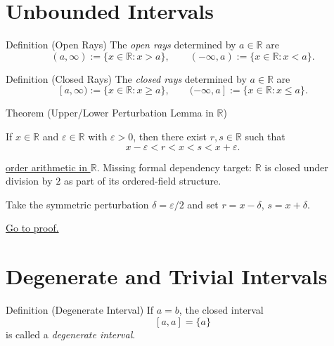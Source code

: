 \section*{Unbounded Intervals}

\begin{definitionbox}{Definition (Open Rays)}
The \emph{open rays} determined by $a \in \mathbb{R}$ are
\[
(a,\infty) := \{ x \in \mathbb{R} : x > a \},
\qquad
(-\infty,a) := \{ x \in \mathbb{R} : x < a \}.
\]
\end{definitionbox}

\begin{definitionbox}{Definition (Closed Rays)}
The \emph{closed rays} determined by $a \in \mathbb{R}$ are
\[
[a,\infty) := \{ x \in \mathbb{R} : x \ge a \},
\qquad
(-\infty,a] := \{ x \in \mathbb{R} : x \le a \}.
\]
\end{definitionbox}

\begin{theorembox}{Theorem (Upper/Lower Perturbation Lemma in $\mathbb{R}$)}
\begin{theorem}
\label{thm:real-upper-lower-perturbation}
If $x\in\mathbb{R}$ and $\varepsilon\in\mathbb{R}$ with $\varepsilon>0$, then
there exist $r,s\in\mathbb{R}$ such that
\[
x-\varepsilon<r<x<s<x+\varepsilon.
\]
\end{theorem}
\end{theorembox}

\begin{dependencies}
\hyperref[prop:order-arithmetic]{order arithmetic in $\mathbb{R}$}.
Missing formal dependency target: $\mathbb{R}$ is closed under division by $2$
as part of its ordered-field structure.
\end{dependencies}

\begin{remark*}
Take the symmetric perturbation $\delta=\varepsilon/2$ and set
$r=x-\delta$, $s=x+\delta$.
\end{remark*}

\begin{remark*}[Proof]
\hyperref[prf:real-upper-lower-perturbation]{Go to proof.}
\end{remark*}

\section*{Degenerate and Trivial Intervals}

\begin{definitionbox}{Definition (Degenerate Interval)}
If $a=b$, the closed interval
\[
[a,a] = \{a\}
\]
is called a \emph{degenerate interval}.
\end{definitionbox}

